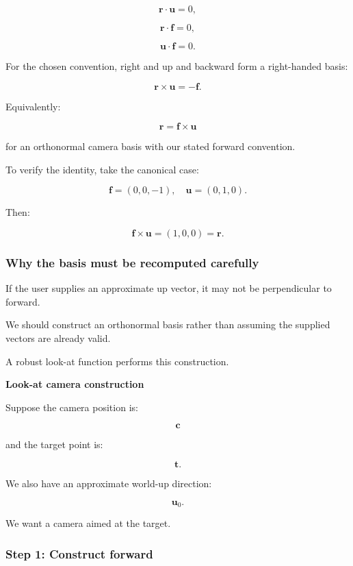 \[
 \mathbf r\cdot\mathbf u=0,
\]

\[
 \mathbf r\cdot\mathbf f=0,
\]

\[
 \mathbf u\cdot\mathbf f=0.
\]

For the chosen convention, right and up and backward form a right-handed basis:

\[
 \mathbf r\times\mathbf u=-\mathbf f.
\]

Equivalently:

\[
 \mathbf r=\mathbf f\times\mathbf u
\]

for an orthonormal camera basis with our stated forward convention.

To verify the identity, take the canonical case:

\[
 \mathbf f=(0,0,-1),\quad \mathbf u=(0,1,0).
\]

Then:

\[
 \mathbf f\times\mathbf u=(1,0,0)=\mathbf r.
\]

\subsubsection{Why the basis must be recomputed carefully}\label{02-foundations-ii-ch032-why-the-basis-must-be-recomputed-carefully}

\hypertarget{02-foundations-ii-ch032-why-the-basis-must-be-recomputed-carefully}{}

If the user supplies an approximate up vector, it may not be perpendicular to forward.

We should construct an orthonormal basis rather than assuming the supplied vectors are already valid.

A robust look-at function performs this construction.

\textbf{Look-at camera construction}

Suppose the camera position is:

\[
 \mathbf c
\]

and the target point is:

\[
 \mathbf t.
\]

We also have an approximate world-up direction:

\[
 \mathbf u_0.
\]

We want a camera aimed at the target.

\subsubsection{Step 1: Construct forward}\label{02-foundations-ii-ch032-step-1-construct-forward}

